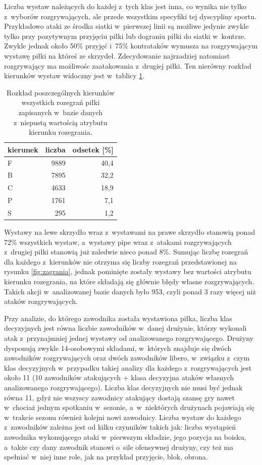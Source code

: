 \documentclass[a4paper,twoside,12pt]{book}
\begin{document}
Liczba wystaw należących do każdej z~tych klas jest inna, co wynika nie tylko z~wyborów rozgrywających, ale przede wszystkim specyfiki tej dyscypliny sportu. Przykładowo ataki ze środka siatki w~pierwszej linii są możliwe jedynie zwykle tylko przy pozytywnym przyjęciu piłki lub dograniu piłki do siatki w~kontrze. Zwykle jednak około 50\% przyjęć i~75\% kontrataków wymusza na rozgrywającym wystawę piłki na któreś ze skrzydeł. Zdecydowanie najrzadziej natomiast rozgrywający ma możliwośc zaatakowania z~drugiej piłki. Ten nierówny rozkład kierunków wystaw widoczny jest w~tablicy \ref{tab:rozkladWystaw}.

\begin{table}
\centering
\caption{Rozkład poszczególnych kierunków wszystkich rozegrań piłki zapisanych w~bazie danych z~niepustą wartością atrybutu kierunku rozegrania.}
\label{tab:rozkladWystaw}
\begin{tabular}{lrr}
	\toprule
	kierunek & liczba & odsetek [\%] \\
	\midrule
	F        &   9889 &         40,4 \\
	B        &   7895 &         32,2 \\
	C        &   4633 &         18,9 \\
	P        &   1761 &          7,1 \\
	S        &    295 &          1,2 \\
	\bottomrule
\end{tabular}
\end{table}
Wystawy na lewe skrzydło wraz z~wystawami na prawe skrzydło stanowią ponad 72\% wszystkich wystaw, a~wystawy pipe wraz z~atakami rozgrywających z~drugiej piłki stanowią już zaledwie nieco ponad 8\%. Sumując liczbę rozegrań dla każdego z~kierunków nie otrzyma się liczby rozegrań przedstawionej na rysunku \ref{fig:zagrania}, jednak pominięte zostały wystawy bez wartości atrybutu kierunku rozegrania, na które składają się głównie błędy własne rozgrywających. Takich akcji w~analizowanej bazie danych było 953, czyli ponad 3 razy więcej niż ataków rozgrywających.

Przy analizie, do którego zawodnika została wystawiona piłka, liczba klas decyzyjnych jest równa liczbie zawodników w~danej drużynie, którzy wykonali atak z~przynajmniej jednej wystawy od analizowanego rozgrywającego. Drużyny dysponują zwykle 14-osobowymi składami, w~których znajduje się dwóch zawodników rozgrywających oraz dwóch zawodników libero, w~związku z~czym klas decyzyjnych w~przypadku takiej analizy dla każdego z~rozgrywających jest około 11 (10 zawodników atakujących + klasa decyzyjna ataków własnych analizowanego rozgrywającego). Liczba klas decyzyjnych nie musi być jednak równa 11, gdyż nie wszyscy zawodnicy atakujący dostają szansę gry nawet w~chociaż jednym spotkaniu w~sezonie, a~w~niektórych drużynach pojawiają się w~trakcie sezonu również kolejni nowi zawodnicy. Liczba wystaw do każdego z~zawodników zależna jest od kilku czynników takich jak: liczba wystąpień zawodnika wykonującego ataki w~pierwszym składzie, jego pozycja na boisku, a~także czy dany zawodnik stanowi o~sile ofensywnej drużyny, czy też ma spełniać w~niej inne role, jak na przykład przyjęcie, blok, obrona. 
\end{document}
